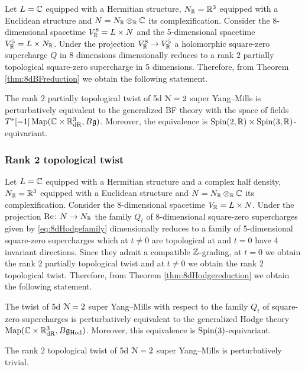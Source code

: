 \documentclass[10pt, oneside]{article}
\newcommand{\Hod}{\mathrm{Hod}}
\renewcommand{\Re}{\mathrm{Re}}
\begin{document}
Let $L = \mathbb C$ equipped with a Hermitian structure, $N_\mathbb R=\mathbb R^3$ equipped with a Euclidean structure and $N=N_\mathbb R\otimes_\mathbb R\mathbb C$ its complexification. Consider the 8-dimensional spacetime $V^8_\mathbb R=L\times N$ and the 5-dimensional spacetime $V^5_\mathbb R=L\times N_\mathbb R$. Under the projection $V^8_\mathbb R\rightarrow V^5_\mathbb R$ a holomorphic square-zero supercharge $Q$ in 8 dimensions dimensionally reduces to a rank $2$ partially topological square-zero supercharge in 5 dimensions. Therefore, from Theorem \ref{thm:8dBFreduction} we obtain the following statement.

\begin{theorem}
The rank $2$ partially topological twist of 5d $\mathcal N=2$ super Yang--Mills is perturbatively equivalent to the generalized BF theory with the space of fields $T^*[-1]\operatorname{Map}(\mathbb C\times \mathbb R^3_{\mathrm{dR}}, B\mathfrak g)$. Moreover, the equivalence is $\mathrm{Spin}(2, \mathbb R)\times\mathrm{Spin}(3, \mathbb R)$-equivariant.
\end{theorem}

\subsubsection{Rank 2 topological twist}
\label{sect:5drank2topologicaltwist}

Let $L=\mathbb C$ equipped with a Hermitian structure and a complex half density, $N_\mathbb R=\mathbb R^3$ equipped with a Euclidean structure and $N=N_\mathbb R\otimes_\mathbb R\mathbb C$ its complexification. Consider the 8-dimensional spacetime $V_\mathbb R=L\times N$. Under the projection $\Re\colon N\rightarrow N_\RR$ the family $Q_t$ of 8-dimensional square-zero supercharges given by \eqref{eq:8dHodgefamily} dimensionally reduces to a family of 5-dimensional square-zero supercharges which at $t\neq 0$ are topological at and $t=0$ have 4 invariant directions. Since they admit a compatible $\mathbb Z$-grading, at $t=0$ we obtain the rank 2 partially topological twist and at $t\neq 0$ we obtain the rank 2 topological twist. Therefore, from Theorem \ref{thm:8dHodgereduction} we obtain the following statement.

\begin{theorem}
The twist of 5d $\mathcal N=2$ super Yang--Mills with respect to the family $Q_t$ of square-zero supercharges is perturbatively equivalent to the generalized Hodge theory $\map(\CC\times \RR^3_{\mathrm{dR}}, B\fg_{\Hod})$. Moreover, this equivalence is $\mathrm{Spin}(3)$-equivariant.
\label{thm:5dHodgetwist}
\end{theorem}

\begin{corollary}
The rank 2 topological twist of 5d $\mathcal N=2$ super Yang--Mills is perturbatively trivial.
\label{cor:5drank2topologicaltwist}
\end{corollary}
\end{document}
